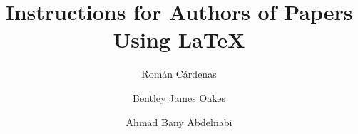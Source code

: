 \documentclass{scspaperproc}
\theoremstyle{scsthe}
\begin{document}
%
%

\def\SCSconferencename{Annual Modeling and Simulation Conference}

\def\SCSconferenceacro{ANNSIM'26}

\def\SCSpublicationyear{2026}

\def\SCSconferenceeditors{G. Rabadi, V. Prabhu, R. Cárdenas, A. Bany Abdelnabi, J. Jabbour, and M. Germanos}

\def\SCSconferencedates{May 4-7}

\def\SCSconferencevenue{University of Central Florida, Orlando, Florida, USA}

\title{Instructions for Authors of Papers Using \LaTeX}

\author[\authorrefmark{1}]{Román Cárdenas}
\author[\authorrefmark{2}]{Bentley James Oakes}
\author[\authorrefmark{3}]{Ahmad Bany Abdelnabi}



\end{document}
